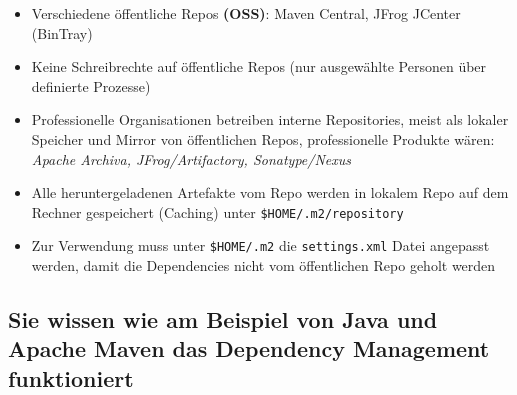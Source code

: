 \documentclass[a4paper]{article}
\begin{document}
		\begin{itemize}
			\item Verschiedene öffentliche Repos \textbf{(OSS)}: Maven Central, JFrog JCenter (BinTray)
			\item Keine Schreibrechte auf öffentliche Repos (nur ausgewählte Personen über definierte Prozesse)
			\item Professionelle Organisationen betreiben interne Repositories, meist als lokaler Speicher und Mirror von öffentlichen Repos, professionelle Produkte wären:\\ 
			\textit{Apache Archiva, JFrog/Artifactory, Sonatype/Nexus}
			\item Alle heruntergeladenen Artefakte vom Repo werden in lokalem Repo auf dem Rechner gespeichert (Caching) unter \texttt{\$HOME/.m2/repository}
			\item Zur Verwendung muss unter \texttt{\$HOME/.m2} die \texttt{settings.xml} Datei angepasst werden, damit die Dependencies nicht vom öffentlichen Repo geholt werden
		\end{itemize}

\newpage
	
	\subsection{Sie wissen wie am Beispiel von Java und Apache Maven das Dependency Management funktioniert}
	
\end{document}
